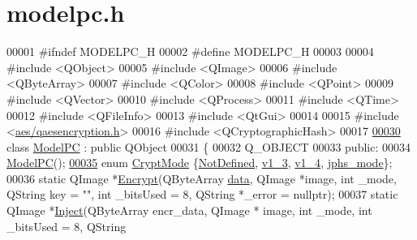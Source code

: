 \hypertarget{modelpc_8h_source}{\section{modelpc.\-h}
}

\begin{DoxyCode}
00001 \textcolor{preprocessor}{#ifndef MODELPC\_H}
00002 \textcolor{preprocessor}{}\textcolor{preprocessor}{#define MODELPC\_H}
00003 \textcolor{preprocessor}{}
00004 \textcolor{preprocessor}{#include <QObject>}
00005 \textcolor{preprocessor}{#include <QImage>}
00006 \textcolor{preprocessor}{#include <QByteArray>}
00007 \textcolor{preprocessor}{#include <QColor>}
00008 \textcolor{preprocessor}{#include <QPoint>}
00009 \textcolor{preprocessor}{#include <QVector>}
00010 \textcolor{preprocessor}{#include <QProcess>}
00011 \textcolor{preprocessor}{#include <QTime>}
00012 \textcolor{preprocessor}{#include <QFileInfo>}
00013 \textcolor{preprocessor}{#include <QtGui>}
00014 
00015 \textcolor{preprocessor}{#include <\hyperlink{qaesencryption_8h}{aes/qaesencryption.h}>}
00016 \textcolor{preprocessor}{#include <QCryptographicHash>}
00017 
\hypertarget{modelpc_8h_source_l00030}{}\hyperlink{class_model_p_c}{00030} \textcolor{keyword}{class }\hyperlink{class_model_p_c}{ModelPC} : \textcolor{keyword}{public} QObject
00031 \{
00032     Q\_OBJECT
00033 \textcolor{keyword}{public}:
00034     \hyperlink{class_model_p_c_ae12ebe65ec973c02a0de4850a7c1e31c}{ModelPC}();
\hypertarget{modelpc_8h_source_l00035}{}\hyperlink{class_model_p_c_a296dd7afe3e1c49b3da25fd644fe4ceba43138df6b33a6b2bf608768907f95abc}{00035}     \textcolor{keyword}{enum} \hyperlink{class_model_p_c_a296dd7afe3e1c49b3da25fd644fe4ceb}{CryptMode} \{\hyperlink{class_model_p_c_a296dd7afe3e1c49b3da25fd644fe4ceba287198790ac9799acd03c99d63a6faea}{NotDefined}, \hyperlink{class_model_p_c_a296dd7afe3e1c49b3da25fd644fe4ceba7612e38de7178170655a56ddcf96e12c}{v1\_3}, \hyperlink{class_model_p_c_a296dd7afe3e1c49b3da25fd644fe4ceba43138df6b33a6b2bf608768907f95abc}{v1\_4}, \hyperlink{class_model_p_c_a296dd7afe3e1c49b3da25fd644fe4ceba90ca32d3ccbb6be224cdfc33f7096eea}{jphs\_mode}\};
00036     \textcolor{keyword}{static} QImage *\hyperlink{class_model_p_c_a271cf9285e32df58ffbfc918e6482bbd}{Encrypt}(QByteArray \hyperlink{namespace_errors_dict_setup_adf4c30d205d29df7343e26f7c62b0685}{data}, QImage *image, \textcolor{keywordtype}{int} \_mode, QString key = \textcolor{stringliteral}{""}, \textcolor{keywordtype}{int} 
      \_bitsUsed = 8, QString *\_error = \textcolor{keyword}{nullptr});
00037     \textcolor{keyword}{static} QImage *\hyperlink{class_model_p_c_ac17e68e6aab134621b0d151d74acdc82}{Inject}(QByteArray encr\_data, QImage * image, \textcolor{keywordtype}{int} \_mode, \textcolor{keywordtype}{int} \_bitsUsed = 8, QString

\end{DoxyCode}
